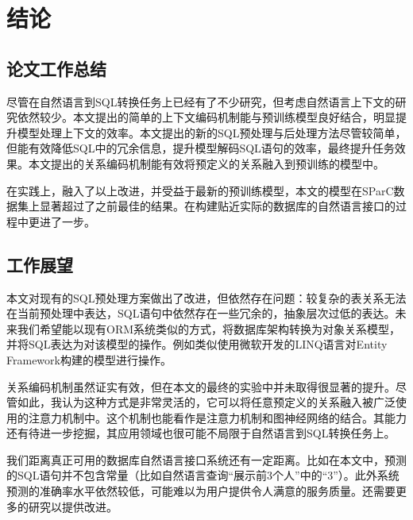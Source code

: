 \chapter{结论}

\section{论文工作总结}

尽管在自然语言到SQL转换任务上已经有了不少研究，但考虑自然语言上下文的研究依然较少。本文提出的简单的上下文编码机制能与预训练模型良好结合，明显提升模型处理上下文的效率。本文提出的新的SQL预处理与后处理方法尽管较简单，但能有效降低SQL中的冗余信息，提升模型解码SQL语句的效率，最终提升任务效果。本文提出的关系编码机制能有效将预定义的关系融入到预训练的模型中。

在实践上，融入了以上改进，并受益于最新的预训练模型，本文的模型在SParC数据集上显著超过了之前最佳的结果。在构建贴近实际的数据库的自然语言接口的过程中更进了一步。

\section{工作展望}

本文对现有的SQL预处理方案做出了改进，但依然存在问题：较复杂的表关系无法在当前预处理中表达，SQL语句中依然存在一些冗余的，抽象层次过低的表达。未来我们希望能以现有ORM系统类似的方式，将数据库架构转换为对象关系模型，并将SQL表达为对该模型的操作。例如类似使用微软开发的LINQ语言对Entity Framework构建的模型进行操作。

关系编码机制虽然证实有效，但在本文的最终的实验中并未取得很显著的提升。尽管如此，我认为这种方式是非常灵活的，它可以将任意预定义的关系融入被广泛使用的注意力机制中。这个机制也能看作是注意力机制和图神经网络的结合。其能力还有待进一步挖掘，其应用领域也很可能不局限于自然语言到SQL转换任务上。

我们距离真正可用的数据库自然语言接口系统还有一定距离。比如在本文中，预测的SQL语句并不包含常量（比如自然语言查询“展示前3个人”中的“3”）。此外系统预测的准确率水平依然较低，可能难以为用户提供令人满意的服务质量。还需要更多的研究以提供改进。
